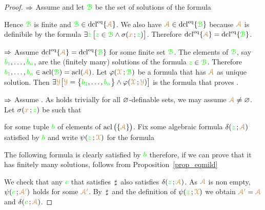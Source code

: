 \documentclass[creche.tex]{subfiles}
\begin{document}
\begin{proof}$\IMP$ Assume  and let ${\gr\B}$ be the set of solutions of the formula


Hence ${\gr\B}$ is finite and ${\gr\B}\in\dcl^\eq\{{\vl\Aa}\}$. We also have ${\vl\Aa}\in\dcl^\eq\{{\gr\B}\}$ because ${\vl\Aa}$ is definibile by the formula $\E{\gr z}\,\big[{\gr z}\in {\gr\B}\wedge \sigma({\mr x}\,;{\gr z})\big]$. Therefore $\dcl^\eq\{{\vl\Aa}\}=\dcl^\eq\{{\gr\B}\}$. 


$\IMP$ Assume $\dcl^\eq\{{\vl\Aa}\}=\dcl^\eq\{{\gr\B}\}$ for some finite set ${\gr\B}$. The elements of ${\gr\B}$, say ${\gr b_1},\dots,{\gr b_n}$, are the (finitely many) solutions of the formula ${\gr z}\in{\gr\B}$. Therefore ${\gr b_1},\dots,{\gr b_n}\in\acl({\gr\B})=\acl({\vl\Aa})$. Let $\phi({\vl\X}\,;{\gr\B})$ be a formula that has ${\vl\Aa}$ as unique solution. Then $\E{\vl\Y} \big[{\vl\Y}=\big\{{\gr b_1},\dots,{\gr b_n}\big\}\wedge \phi({\vl\X}\,;{\vl\Y})\big]$ is the formula that proves .

$\IMP$ Assume . As  holds trivially for all $\0$-definable sets, we may assume ${\vl\Aa}\neq\0$. Let $\sigma({\mr x}\,;{\gr z})$ be such that


for some tuple ${\gr b}$ of elements of $\acl\big(\{{\vl\Aa}\}\big)$.  Fix some algebraic formula $\delta({\gr z}\,;{\vl\Aa})$ satisfied by  ${\gr b}$ and write $\psi({\gr z}\,;{\vl\X})$ for the formula


The following formula is clearly satisfied by ${\gr b}$ therefore, if we can prove that it has finitely many solutions,  follows from Proposition~\ref{prop_eqmild}


We check that any ${\gr c}$ that satisfies $\,\sharp\,$ also satisfies $\delta({\gr z}\,;{\vl\Aa})$. As ${\vl\Aa}$ is non empty, $\psi({\gr c}\,;{\vl\Aa'})$ holds for some ${\vl\Aa'}$. By $\,\sharp\,$ and the definition of $\psi({\gr z}\,;{\vl\X})$ we obtain ${\vl\Aa'}={\vl\Aa}$ and  $\delta({\gr c}\,;{\vl\Aa})$.
\end{proof}
\end{document}
